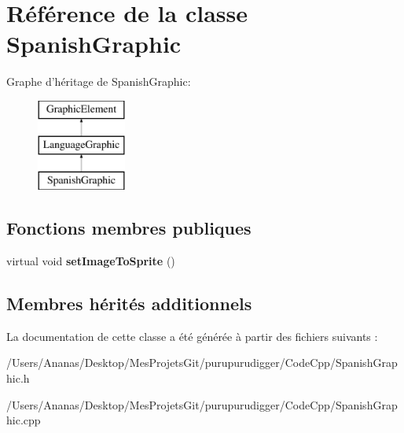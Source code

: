 \hypertarget{class_spanish_graphic}{\section{Référence de la classe Spanish\-Graphic}
\label{class_spanish_graphic}
}
Graphe d'héritage de Spanish\-Graphic\-:\begin{figure}[H]
\begin{center}
\leavevmode
\includegraphics[height=3.000000cm]{class_spanish_graphic}
\end{center}
\end{figure}
\subsection*{Fonctions membres publiques}
\begin{DoxyCompactItemize}
\item 
\hypertarget{class_spanish_graphic_a7489943639278c9586612319afea18fa}{virtual void {\bfseries set\-Image\-To\-Sprite} ()}\label{class_spanish_graphic_a7489943639278c9586612319afea18fa}

\end{DoxyCompactItemize}
\subsection*{Membres hérités additionnels}


La documentation de cette classe a été générée à partir des fichiers suivants \-:\begin{DoxyCompactItemize}
\item 
/\-Users/\-Ananas/\-Desktop/\-Mes\-Projets\-Git/purupurudigger/\-Code\-Cpp/Spanish\-Graphic.\-h\item 
/\-Users/\-Ananas/\-Desktop/\-Mes\-Projets\-Git/purupurudigger/\-Code\-Cpp/Spanish\-Graphic.\-cpp\end{DoxyCompactItemize}
